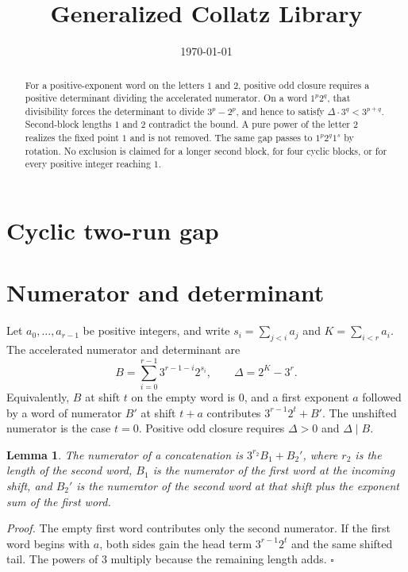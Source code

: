 \documentclass[11pt,letterpaper]{article}
\title{Generalized Collatz Library}
\author{}
\date{\today}
\newtheorem{lemma}[theorem]{Lemma}
\newenvironment{proof}{\noindent\textit{Proof.}}{\hfill\(\square\)}
\begin{document}
\maketitle
\section*{Cyclic two-run gap}

\begin{abstract}
For a positive-exponent word on the letters \(1\) and \(2\), positive odd closure requires a positive determinant dividing the accelerated numerator. On a word \(1^p2^q\), that divisibility forces the determinant to divide \(3^p-2^p\), and hence to satisfy \(\Delta\cdot 3^q<3^{p+q}\). Second-block lengths \(1\) and \(2\) contradict the bound. A pure power of the letter \(2\) realizes the fixed point \(1\) and is not removed. The same gap passes to \(1^p2^q1^s\) by rotation. No exclusion is claimed for a longer second block, for four cyclic blocks, or for every positive integer reaching \(1\).
\end{abstract}

\section{Numerator and determinant}

Let \(a_0,\ldots,a_{r-1}\) be positive integers, and write \(s_i=\sum_{j<i}a_j\) and \(K=\sum_{i<r}a_i\). The accelerated numerator and determinant are
\[
B=\sum_{i=0}^{r-1}3^{r-1-i}2^{s_i},\qquad
\Delta=2^K-3^r.
\]
Equivalently, \(B\) at shift \(t\) on the empty word is \(0\), and a first exponent \(a\) followed by a word of numerator \(B'\) at shift \(t+a\) contributes \(3^{r-1}2^t+B'\). The unshifted numerator is the case \(t=0\). Positive odd closure requires \(\Delta>0\) and \(\Delta\mid B\).

\begin{lemma}
\label{lem:append}
The numerator of a concatenation is \(3^{r_2}B_1+B_2'\), where \(r_2\) is the length of the second word, \(B_1\) is the numerator of the first word at the incoming shift, and \(B_2'\) is the numerator of the second word at that shift plus the exponent sum of the first word.
\end{lemma}

\begin{proof}
The empty first word contributes only the second numerator. If the first word begins with \(a\), both sides gain the head term \(3^{r-1}2^t\) and the same shifted tail. The powers of \(3\) multiply because the remaining length adds.
\end{proof}
\end{document}
